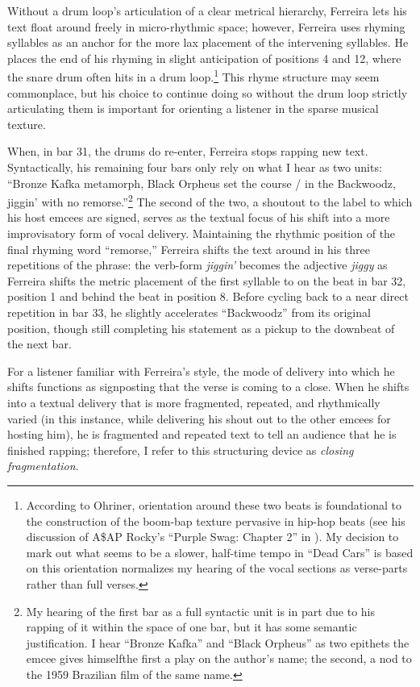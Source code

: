 Without a drum loop's articulation of a clear metrical hierarchy, Ferreira lets his text
float around freely in micro-rhythmic space; however, Ferreira uses rhyming syllables as
an anchor for the more lax placement of the intervening syllables. He places the end of 
his rhyming in slight anticipation of positions 4 and 12, where the snare drum often hits
in a drum loop.\footnote{
    According to Ohriner, orientation around these two beats is foundational to the 
    construction of the boom-bap texture pervasive in hip-hop beats (see his discussion
    of A\$AP Rocky's ``Purple Swag:  Chapter 2'' in 
    \autocite[18]{mitchellohrinerFlowRhythmicVoice2019}). My decision to mark out what 
    seems to be a slower, half-time tempo in ``Dead Cars'' is based on this orientation
    normalizes my hearing of the vocal sections as verse-parts rather than full verses.}
This rhyme structure may seem commonplace, but his choice to continue doing so without 
the drum loop strictly articulating them is important for orienting a listener in the 
sparse musical texture.

When, in bar 31, the drums do re-enter, Ferreira stops rapping new text. Syntactically,
his remaining four bars only rely on what I hear as two units: ``Bronze Kafka metamorph, 
Black Orpheus set the course / in the Backwoodz, jiggin' with no  remorse.''\footnote{
    My hearing of the first bar as a full syntactic unit is in part due to his rapping 
    of it within the space of one bar, but it has some semantic justification. I hear
    ``Bronze Kafka'' and ``Black Orpheus'' as two epithets the emcee gives 
    himself\textemdash the first a play on the author's name; the second, a nod to the
    1959 Brazilian film of the same name.}
The second of the two, a shoutout to the label to which his host emcees are signed, serves
as the textual focus of his shift into a more improvisatory form of vocal delivery. Maintaining
the rhythmic position of the final rhyming word ``remorse,'' Ferreira shifts the text around
in his three repetitions of the phrase: the verb-form \textit{jiggin'} becomes the adjective
\textit{jiggy} as Ferreira shifts the metric placement of the first syllable to on the beat
in bar 32, position 1 and behind the beat in position 8. Before cycling back to a near direct
repetition in bar 33, he slightly accelerates ``Backwoodz'' from its original position, though
still completing his statement as a pickup to the downbeat of the next bar.

For a listener familiar with Ferreira's style, the mode of delivery into which he shifts
functions as signposting that the verse is coming to a close. When he shifts into a textual
delivery that is more fragmented, repeated, and rhythmically varied (in this instance, while
delivering his shout out to the other emcees for hosting him), he is fragmented and repeated
text to tell an audience that he is finished rapping; therefore, I refer to this structuring 
device as \emph{closing fragmentation}.

